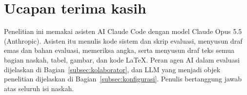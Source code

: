 \documentclass[conference]{IEEEtran}
\begin{document}
\section*{Ucapan terima kasih}
Penelitian ini memakai asisten AI Claude Code dengan model Claude Opus 5.5 (Anthropic). Asisten itu menulis kode sistem dan skrip evaluasi, menyusun draf emas dan bahan evaluasi, memeriksa angka, serta menyusun draf teks semua bagian naskah, tabel, gambar, dan kode \LaTeX{}. Peran agen AI dalam evaluasi dijelaskan di Bagian~\ref{subsec:kolaborator}, dan LLM yang menjadi objek penelitian dijelaskan di Bagian~\ref{subsec:konfigurasi}. Penulis bertanggung jawab atas seluruh isi naskah.



\end{document}
